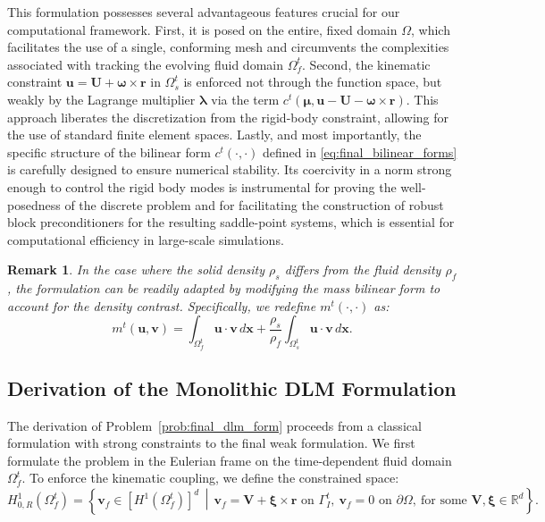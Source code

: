 \documentclass{article}
\newcommand{\bU}{{\mathbf{U}}}
\newcommand{\bx}{{\mathbf{x}}}
\newcommand{\bu}{{\mathbf{u}}}
\newcommand{\bv}{{\mathbf{v}}}
\newcommand{\br}{{\mathbf{r}}}
\newtheorem{remark}[theorem]{Remark}
\begin{document}
This formulation possesses several advantageous features crucial for our computational framework. First, it is posed on the entire, fixed domain $\Omega$, which facilitates the use of a single, conforming mesh and circumvents the complexities associated with tracking the evolving fluid domain $\Omega_f^t$. Second, the kinematic constraint $\bu = \bU + \boldsymbol{\omega} \times \br$ in $\Omega_s^t$ is enforced not through the function space, but weakly by the Lagrange multiplier $\boldsymbol{\lambda}$ via the term $c^t(\boldsymbol{\mu}, \bu - \bU - \boldsymbol{\omega} \times \br)$. This approach liberates the discretization from the rigid-body constraint, allowing for the use of standard finite element spaces. Lastly, and most importantly, the specific structure of the bilinear form $c^t(\cdot, \cdot)$ defined in \eqref{eq:final_bilinear_forms} is carefully designed to ensure numerical stability. Its coercivity in a norm strong enough to control the rigid body modes is instrumental for proving the well-posedness of the discrete problem and for facilitating the construction of robust block preconditioners for the resulting saddle-point systems, which is essential for computational efficiency in large-scale simulations.

\begin{remark}\label{rem:density}
    In the case where the solid density $\rho_s$ differs from the fluid density $\rho_f$, the formulation can be readily adapted by modifying the mass bilinear form to account for the density contrast. Specifically, we redefine $m^t(\cdot, \cdot)$ as:
    \begin{equation}
        m^t(\bu,\bv) = \int_{\Omega_f^t} \bu \cdot \bv  \,d\bx + \frac{\rho_s}{\rho_f} \int_{\Omega_s^t} \bu \cdot \bv  \,d\bx.
    \end{equation}
\end{remark}

\subsection{Derivation of the Monolithic DLM Formulation}

The derivation of Problem~\ref{prob:final_dlm_form} proceeds from a classical formulation with strong constraints to the final weak formulation. We first formulate the problem in the Eulerian frame on the time-dependent fluid domain $\Omega_f^t$. To enforce the kinematic coupling, we define the constrained space:
\begin{equation}\label{eq:restricted_space}
H_{0,R}^1(\Omega_f^t) = \left\{ \bv_f \in [H^1(\Omega_f^t)]^d \,\middle|\,
\bv_f = \mathbf{V} + \boldsymbol{\xi} \times \mathbf{r} \text{ on } \Gamma_I^t,\ \bv_f = 0 \text{ on } \partial\Omega,\ \text{for some } \mathbf{V}, \boldsymbol{\xi} \in \mathbb{R}^d
\right\}.
\end{equation}
\end{document}

